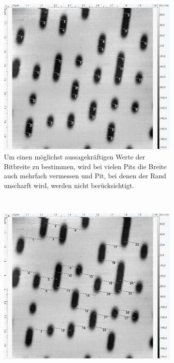 \begin{figure}[H]
\centering
	\begin{subfigure}[t]{0.4\textwidth}
	\includegraphics[width=\textwidth]{AFM_auswertung/cd_breite.png}
	\caption{Um einen m\"oglichst aussagekr\"aftigen Werte der Bitbreite zu bestimmen, wird bei vielen Pits die Breite auch mehrfach vermessen und Pit, bei denen der Rand unscharft wird, werden nicht ber\"ucksichtigt.}
	\label{abb:}
	\end{subfigure}
	~
	\begin{subfigure}[t]{0.4\textwidth}
	\includegraphics[width=\textwidth]{AFM_auswertung/cd_abstand.png}

\end{subfigure}
\end{figure}
